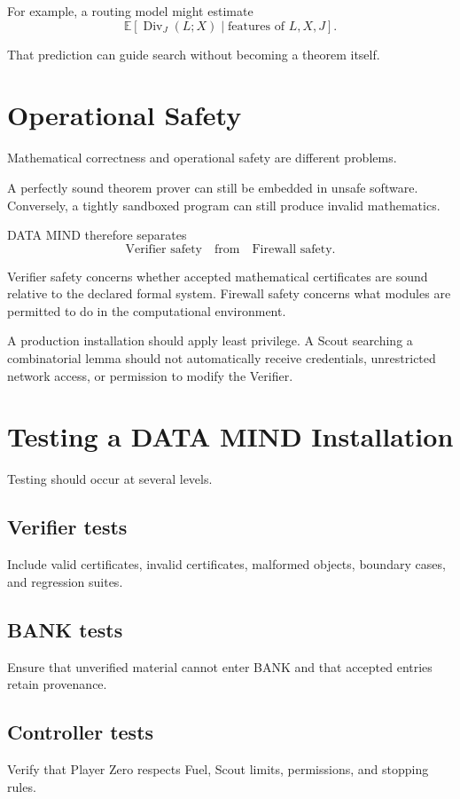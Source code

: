 \documentclass[11pt]{article}
\begin{document}
For example, a routing model might estimate
\[
\mathbb{E}[\operatorname{Div}_J(L;X)\mid \text{features of }L,X,J].
\]

That prediction can guide search without becoming a theorem itself.

\section{Operational Safety}

Mathematical correctness and operational safety are different problems.

A perfectly sound theorem prover can still be embedded in unsafe software. Conversely, a tightly sandboxed program can still produce invalid mathematics.

DATA MIND therefore separates
\[
\text{Verifier safety}
\quad\text{from}\quad
\text{Firewall safety}.
\]

Verifier safety concerns whether accepted mathematical certificates are sound relative to the declared formal system. Firewall safety concerns what modules are permitted to do in the computational environment.

A production installation should apply least privilege. A Scout searching a combinatorial lemma should not automatically receive credentials, unrestricted network access, or permission to modify the Verifier.

\section{Testing a DATA MIND Installation}

Testing should occur at several levels.

\subsection{Verifier tests}
Include valid certificates, invalid certificates, malformed objects, boundary cases, and regression suites.

\subsection{BANK tests}
Ensure that unverified material cannot enter BANK and that accepted entries retain provenance.

\subsection{Controller tests}
Verify that Player Zero respects Fuel, Scout limits, permissions, and stopping rules.
\end{document}
